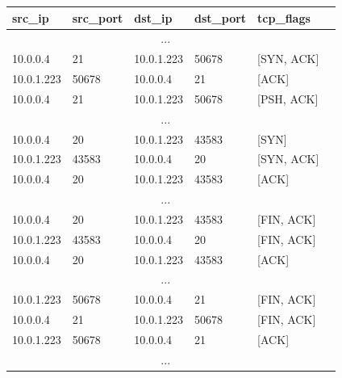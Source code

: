 \begin{parts}
{
\centering
\begin{tabular}{|l|l|l|l|l|l|}
\hline
\textbf{src\_ip}  & \textbf{src\_port}  & \textbf{dst\_ip}  & \textbf{dst\_port}  & \textbf{tcp\_flags} \\ \hline
\multicolumn{5}{|c|}{...} \\ \hline
10.0.0.4          & 21                  & 10.0.1.223        & 50678               & {[}SYN, ACK{]}      \\ \hline
10.0.1.223        & 50678               & 10.0.0.4          & 21                  & {[}ACK{]}           \\ \hline
10.0.0.4          & 21                  & 10.0.1.223        & 50678               & {[}PSH, ACK{]}      \\ \hline
\multicolumn{5}{|c|}{...} \\ \hline
10.0.0.4          & 20                  & 10.0.1.223        & 43583               & {[}SYN{]}           \\ \hline
10.0.1.223        & 43583               & 10.0.0.4          & 20                  & {[}SYN, ACK{]}      \\ \hline
10.0.0.4          & 20                  & 10.0.1.223        & 43583               & {[}ACK{]}           \\ \hline
\multicolumn{5}{|c|}{...} \\ \hline
10.0.0.4          & 20                  & 10.0.1.223        & 43583               & {[}FIN, ACK{]}      \\ \hline
10.0.1.223        & 43583               & 10.0.0.4          & 20                  & {[}FIN, ACK{]}      \\ \hline
10.0.0.4          & 20                  & 10.0.1.223        & 43583               & {[}ACK{]}           \\ \hline
\multicolumn{5}{|c|}{...} \\ \hline
10.0.1.223        & 50678               & 10.0.0.4          & 21                  & {[}FIN, ACK{]}      \\ \hline
10.0.0.4          & 21                  & 10.0.1.223        & 50678               & {[}FIN, ACK{]}      \\ \hline
10.0.1.223        & 50678               & 10.0.0.4          & 21                  & {[}ACK{]}           \\ \hline
\multicolumn{5}{|c|}{...} \\ \hline
\end{tabular}\\
}


\end{parts}
